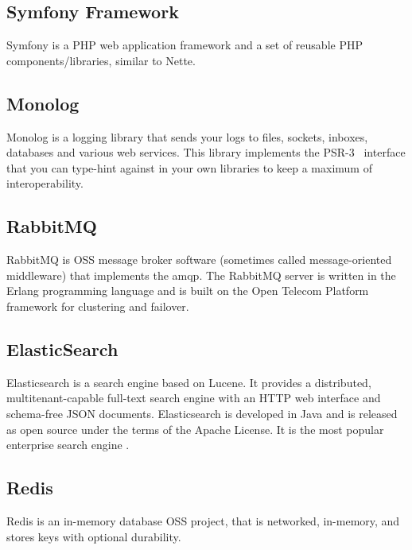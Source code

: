 \tocless\subsection{Symfony Framework} \label{sec:theory:symfony}

Symfony is a PHP web application framework and a set of reusable PHP components/libraries, similar to Nette.~\cite{wiki:symfony}

\tocless\subsection{Monolog} \label{sec:theory:monolog}

Monolog is a logging library that sends your logs to files, sockets, inboxes, databases and various web services. This library implements the PSR-3~\cite{fig:psr} interface that you can type-hint against in your own libraries to keep a maximum of interoperability.~\cite{monolog:readme}

\tocless\subsection{RabbitMQ} \label{sec:theory:rabbitmq}

RabbitMQ is OSS message broker software (sometimes called message-oriented middleware) that implements the \gls{amqp}. The RabbitMQ server is written in the Erlang programming language and is built on the Open Telecom Platform framework for clustering and failover.~\cite{wiki:rabbitmq}

\tocless\subsection{ElasticSearch} \label{sec:theory:elasticsearch}

Elasticsearch is a search engine based on Lucene. It provides a distributed, multitenant-capable full-text search engine with an HTTP web interface and schema-free JSON documents. Elasticsearch is developed in Java and is released as open source under the terms of the Apache License. It is the most popular enterprise search engine .~\cite{wiki:elasticsearch}

\tocless\subsection{Redis} \label{sec:theory:redis}

Redis is an in-memory database OSS project, that is networked, in-memory, and stores keys with optional durability.~\cite{wiki:redis}

